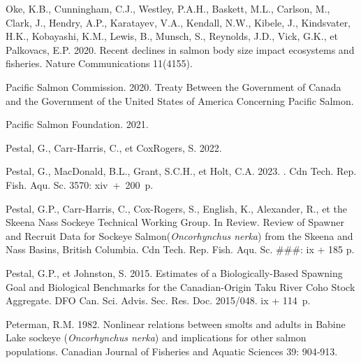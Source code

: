 \documentclass[french,11pt]{book}
\begin{document}
\begin{CSLReferences}{1}{0}
Oke, K.B., Cunningham, C.J., Westley, P.A.H., Baskett, M.L., Carlson, M., Clark, J., Hendry, A.P., Karatayev, V.A., Kendall, N.W., Kibele, J., Kindsvater, H.K., Kobayashi, K.M., Lewis, B., Munsch, S., Reynolds, J.D., Vick, G.K., et Palkovacs, E.P. 2020. {Recent declines in salmon body size impact ecosystems and fisheries}. {Nature Communications} 11(4155).

Pacific Salmon Commission. 2020. {Treaty Between the Government of Canada and the Government of the United States of America Concerning Pacific Salmon}.

Pacific Salmon Foundation. 2021.

Pestal, G., Carr-Harris, C., et CoxRogers, S. 2022.

Pestal, G., MacDonald, B.L., Grant, S.C.H., et Holt, C.A. 2023. . Cdn Tech. Rep. Fish. Aqu. Sc. 3570: xiv~+~200~p.

Pestal, G.P., Carr-Harris, C., Cox-Rogers, S., English, K., Alexander, R., et the Skeena Nass Sockeye Technical Working Group. In Review. {Review of Spawner and Recruit Data for Sockeye Salmon(}\emph{Oncorhynchus nerka}{) from the Skeena and Nass Basins, British Columbia}. Cdn Tech. Rep. Fish. Aqu. Sc. \#\#\#: ix + 185 p.

Pestal, G.P., et Johnston, S. 2015. {Estimates of a Biologically-Based Spawning Goal and Biological Benchmarks for the Canadian-Origin Taku River Coho Stock Aggregate}. DFO Can. Sci. Advis. Sec. Res. Doc. 2015/048. ix + 114~p.

Peterman, R.M. 1982. {Nonlinear relations between smolts and adults in Babine Lake sockeye (}\emph{Oncorhynchus nerka}{) and implications for other salmon populations}. Canadian Journal of Fisheries and Aquatic Sciences 39: 904‑913.


\end{CSLReferences}
\end{document}
